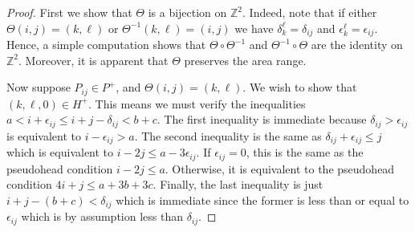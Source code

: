 \documentclass[11pt,reqno]{amsart}
\theoremstyle{definition}
\numberwithin{equation}{section}
\begin{document}
\begin{proof}
First we show that $\Theta$ is a bijection on $\mathbb{Z}^2$.  Indeed, note that if either $\Theta(i,j)=(k,\ell)$ or 
$\Theta^{-1}(k,\ell)=(i,j)$ we have $\delta_k^\ell=\delta_{ij}$ and $\epsilon_k^\ell=\epsilon_{ij}$.  Hence, a simple 
computation shows that $\Theta \circ \Theta^{-1}$ and $\Theta^{-1} \circ \Theta$ are the identity on $\mathbb{Z}^2$.  
Moreover, it is apparent that $\Theta$ preserves the area range.

Now suppose $P_{ij} \in P^+$, and $\Theta(i,j)=(k,\ell)$. We wish to show that $(k,\ell,0) \in H^+$.  This means we must 
verify the inequalities $a< i+ \epsilon_{ij} \leqslant i+j-\delta_{ij} <b+c$. The first inequality is immediate because 
$\delta_{ij} > \epsilon_{ij}$ is equivalent to $i-\epsilon_{ij} > a$.  The second inequality is the same as 
$\delta_{ij}+\epsilon_{ij} \leqslant j$ which is equivalent to $i-2j \leqslant a- 3 \epsilon_{ij}$.  If $\epsilon_{ij}=0$,
this is the same as the pseudohead condition $i-2j \leqslant a$.  Otherwise, it is equivalent to the pseudohead condition 
$4i+j \leqslant a+3b+3c$.  Finally, the last inequality is just $i+j-(b+c)< \delta_{ij}$ which is immediate since the former is 
less than or equal to $\epsilon_{ij}$ which is by assumption less than $\delta_{ij}$.


\end{proof}
\end{document}

